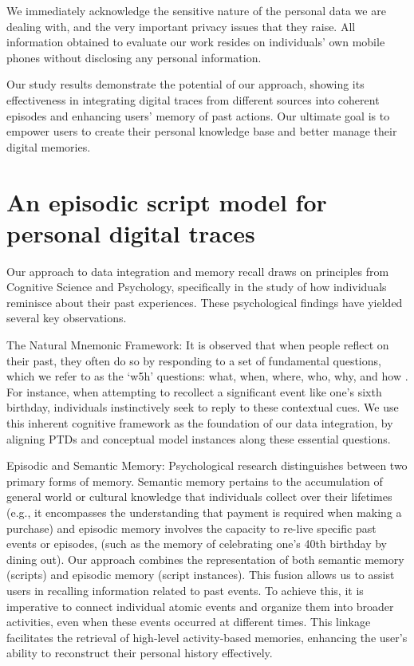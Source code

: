 \documentclass[11pt]{article}
\begin{document}
We immediately acknowledge the sensitive nature of the personal data we are dealing with, and the very important privacy issues that they raise. All information  obtained to evaluate our work resides on individuals' own mobile phones without disclosing any personal information.

Our study results demonstrate the potential of our approach, showing its effectiveness in integrating digital traces from different sources into coherent episodes and enhancing users' memory of past actions. Our ultimate goal is to empower users to create their personal knowledge base and better manage their digital memories.


\section{An episodic script model for personal digital traces}

Our approach to data integration and memory recall draws on principles from Cognitive Science and Psychology, specifically in the study of how individuals reminisce about their past experiences. These psychological findings have yielded several key observations.

The Natural Mnemonic Framework: It is observed that when people reflect on their past, they often do so by responding to a set of fundamental questions, which we refer to as the `w5h' questions: what, when, where, who, why, and how \cite{schacter, jones}. For instance, when attempting to recollect a significant event like one's sixth birthday, individuals instinctively seek to reply to these contextual cues. We use this inherent cognitive framework as the foundation of our data integration,  by aligning PTDs and conceptual model instances along these essential questions.

Episodic and Semantic Memory: Psychological research \cite{tulving, conway} distinguishes between two primary forms of memory. Semantic memory pertains to the accumulation of general world or cultural knowledge that individuals collect over their lifetimes (e.g., it encompasses the understanding that payment is required when making a purchase) and episodic memory involves the capacity to re-live specific past events or episodes, (such as the memory of celebrating one's 40th birthday by dining out).  Our approach  combines the representation of both semantic memory (scripts) and episodic memory (script instances). This fusion allows us to assist users in recalling information related to past events. To achieve this, it is imperative to connect individual atomic events and organize them into broader activities, even when these events occurred at different times. This linkage facilitates the retrieval of high-level activity-based memories, enhancing the user's ability to reconstruct their personal history effectively.
\end{document}
